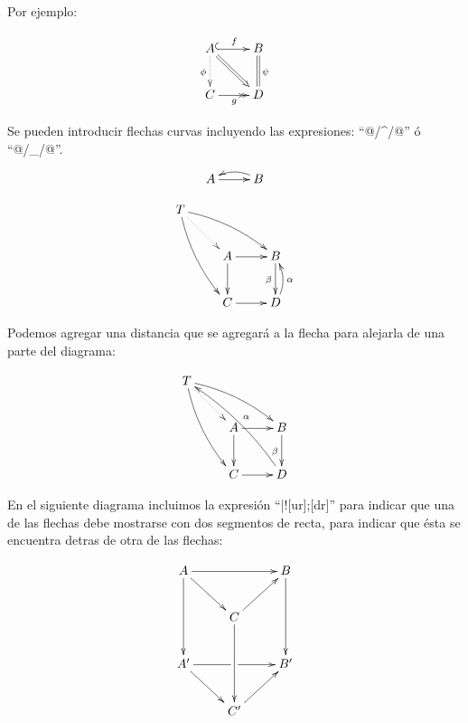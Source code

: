 \documentclass[letterpaper,12pt]{article}
\begin{document}
Por ejemplo:

\bigskip

\begin{equation*}
\xymatrix{
    A \ar@{^{(}->}[r]^f \ar@{.>}[d]_\phi \ar@{=>}[rd] & B \ar@{=}[d]^\psi \\
    C \ar@{->>}[r]_g & D
}
\end{equation*}

\bigskip

Se pueden introducir flechas curvas incluyendo las expresiones: ``@\verb@/^/@'' ó ``@\verb@/_/@''.

\bigskip

\begin{equation*}
\xymatrix{ A \ar[r] & B \ar@/_/@{->}[l] }
\end{equation*}

\bigskip

\begin{equation*}
\xymatrix{
    T \ar@/^/[rrd] \ar@/_/[rdd] \ar@{.>}[rd] \\
    & A \ar[r] \ar[d] & B \ar[d]_\beta \\
    & C \ar[r] & D \ar@/_/[u]_\alpha
  }
\end{equation*}

\bigskip

Podemos agregar una distancia que se agregará a la flecha para alejarla de una parte del diagrama:

\bigskip

\begin{equation*}
\xymatrix{
    T \ar@/^/[rrd] \ar@/_/[rdd] \ar@{.>}[rd] \\
    & A \ar[r] \ar[d] & B \ar[d]_\beta \\
    & C \ar[r] & D \ar@/_/[uull]_\alpha
  }
\end{equation*}

\bigskip

En el siguiente diagrama incluimos la expresión ``\verb@|!{[ur];[dr]}\hole@'' para indicar que una de las flechas debe mostrarse con dos segmentos de recta, para indicar que ésta se encuentra detras de otra de las flechas:

\bigskip

\begin{equation*}
\xymatrix {
    A \ar[rr] \ar[rd] \ar[dd] && B \ar[dd] \\
    & C \ar[ru] \ar[dd] \\
    A' \ar[rr] |!{[ur];[dr]}\hole \ar[rd] && B' \\
    & C' \ar[ru] 
    }
\end{equation*}
\end{document}
